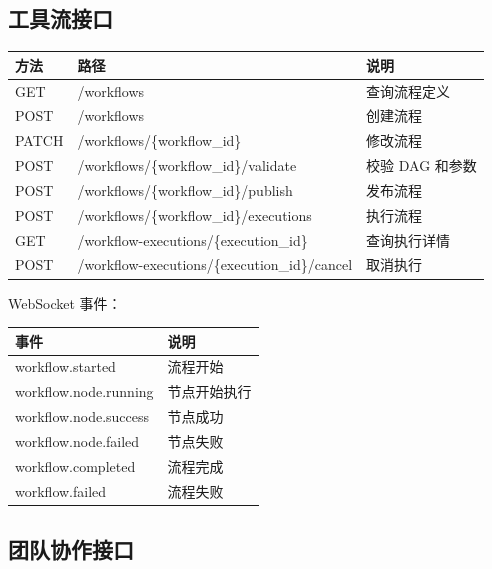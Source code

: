 \documentclass[a4paper,zihao=-4]{ctexart}
\begin{document}
\hypertarget{ux5de5ux5177ux6d41ux63a5ux53e3}{%
\subsection{工具流接口}\label{ux5de5ux5177ux6d41ux63a5ux53e3}}

\begin{longtable}{|>{\raggedright\arraybackslash}p{2.4cm}|>{\raggedright\arraybackslash}p{\dimexpr(\linewidth-2.4cm-6\tabcolsep-4\arrayrulewidth)/2\relax}|>{\raggedright\arraybackslash}p{\dimexpr(\linewidth-2.4cm-6\tabcolsep-4\arrayrulewidth)/2\relax}|}
\hline
方法 & 路径 & 说明\tabularnewline
\hline
\endhead
GET & /workflows & 查询流程定义\tabularnewline
\hline
POST & /workflows & 创建流程\tabularnewline
\hline
PATCH & /workflows/\{workflow\_id\} & 修改流程\tabularnewline
\hline
POST & /workflows/\{workflow\_id\}/validate & 校验 DAG 和参数\tabularnewline
\hline
POST & /workflows/\{workflow\_id\}/publish & 发布流程\tabularnewline
\hline
POST & /workflows/\{workflow\_id\}/executions & 执行流程\tabularnewline
\hline
GET & /workflow-executions/\{execution\_id\} & 查询执行详情\tabularnewline
\hline
POST & /workflow-executions/\{execution\_id\}/cancel & 取消执行\tabularnewline
\hline
\end{longtable}

WebSocket 事件：

\begin{longtable}{|>{\raggedright\arraybackslash}p{2.4cm}|>{\raggedright\arraybackslash}p{\dimexpr(\linewidth-2.4cm-4\tabcolsep-3\arrayrulewidth)/1\relax}|}
\hline
事件 & 说明\tabularnewline
\hline
\endhead
workflow.started & 流程开始\tabularnewline
\hline
workflow.node.running & 节点开始执行\tabularnewline
\hline
workflow.node.success & 节点成功\tabularnewline
\hline
workflow.node.failed & 节点失败\tabularnewline
\hline
workflow.completed & 流程完成\tabularnewline
\hline
workflow.failed & 流程失败\tabularnewline
\hline
\end{longtable}

\hypertarget{ux56e2ux961fux534fux4f5cux63a5ux53e3}{%
\subsection{团队协作接口}\label{ux56e2ux961fux534fux4f5cux63a5ux53e3}}
\end{document}
